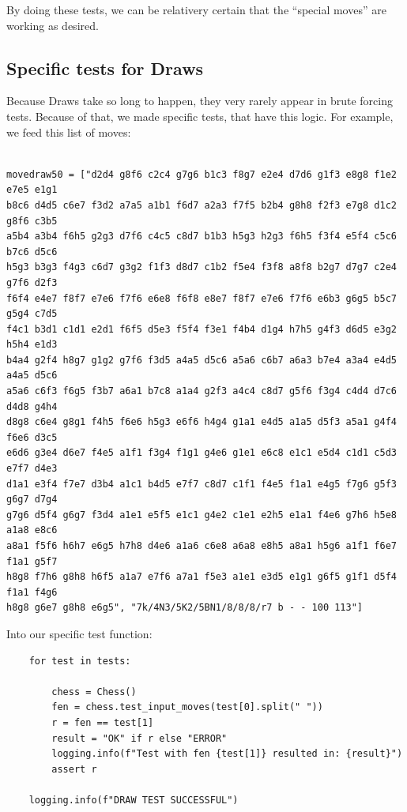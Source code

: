\documentclass[10pt]{article}
\begin{document}
\begin{lstlisting}
\end{lstlisting}

By doing these tests, we can be relativery certain that the ``special moves'' are working
as desired.

\subsection{Specific tests for Draws}

Because Draws take so long to happen, they very rarely appear in brute forcing
tests. Because of that, we made specific tests, that have this logic.
For example, we feed this list of moves: 

\begin{lstlisting}

movedraw50 = ["d2d4 g8f6 c2c4 g7g6 b1c3 f8g7 e2e4 d7d6 g1f3 e8g8 f1e2 e7e5 e1g1
b8c6 d4d5 c6e7 f3d2 a7a5 a1b1 f6d7 a2a3 f7f5 b2b4 g8h8 f2f3 e7g8 d1c2 g8f6 c3b5
a5b4 a3b4 f6h5 g2g3 d7f6 c4c5 c8d7 b1b3 h5g3 h2g3 f6h5 f3f4 e5f4 c5c6 b7c6 d5c6
h5g3 b3g3 f4g3 c6d7 g3g2 f1f3 d8d7 c1b2 f5e4 f3f8 a8f8 b2g7 d7g7 c2e4 g7f6 d2f3
f6f4 e4e7 f8f7 e7e6 f7f6 e6e8 f6f8 e8e7 f8f7 e7e6 f7f6 e6b3 g6g5 b5c7 g5g4 c7d5
f4c1 b3d1 c1d1 e2d1 f6f5 d5e3 f5f4 f3e1 f4b4 d1g4 h7h5 g4f3 d6d5 e3g2 h5h4 e1d3
b4a4 g2f4 h8g7 g1g2 g7f6 f3d5 a4a5 d5c6 a5a6 c6b7 a6a3 b7e4 a3a4 e4d5 a4a5 d5c6
a5a6 c6f3 f6g5 f3b7 a6a1 b7c8 a1a4 g2f3 a4c4 c8d7 g5f6 f3g4 c4d4 d7c6 d4d8 g4h4
d8g8 c6e4 g8g1 f4h5 f6e6 h5g3 e6f6 h4g4 g1a1 e4d5 a1a5 d5f3 a5a1 g4f4 f6e6 d3c5
e6d6 g3e4 d6e7 f4e5 a1f1 f3g4 f1g1 g4e6 g1e1 e6c8 e1c1 e5d4 c1d1 c5d3 e7f7 d4e3
d1a1 e3f4 f7e7 d3b4 a1c1 b4d5 e7f7 c8d7 c1f1 f4e5 f1a1 e4g5 f7g6 g5f3 g6g7 d7g4
g7g6 d5f4 g6g7 f3d4 a1e1 e5f5 e1c1 g4e2 c1e1 e2h5 e1a1 f4e6 g7h6 h5e8 a1a8 e8c6
a8a1 f5f6 h6h7 e6g5 h7h8 d4e6 a1a6 c6e8 a6a8 e8h5 a8a1 h5g6 a1f1 f6e7 f1a1 g5f7
h8g8 f7h6 g8h8 h6f5 a1a7 e7f6 a7a1 f5e3 a1e1 e3d5 e1g1 g6f5 g1f1 d5f4 f1a1 f4g6
h8g8 g6e7 g8h8 e6g5", "7k/4N3/5K2/5BN1/8/8/8/r7 b - - 100 113"]

\end{lstlisting}

Into our specific test function:

\begin{lstlisting}
    for test in tests:

        chess = Chess()
        fen = chess.test_input_moves(test[0].split(" "))
        r = fen == test[1]
        result = "OK" if r else "ERROR"
        logging.info(f"Test with fen {test[1]} resulted in: {result}")
        assert r

    logging.info(f"DRAW TEST SUCCESSFUL")

\end{lstlisting}
\end{document}
